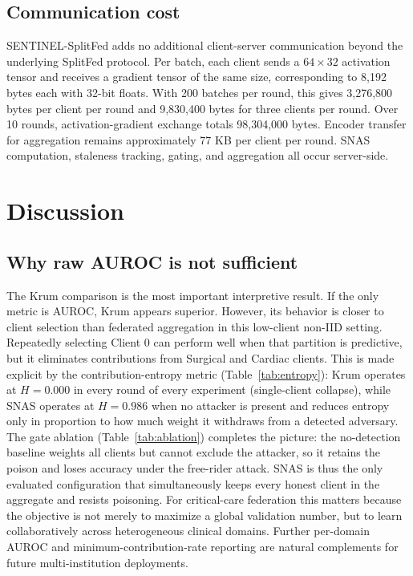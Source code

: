\documentclass[pdflatex,sn-mathphys-num]{sn-jnl}
\begin{document}
\subsection{Communication cost}

SENTINEL-SplitFed adds no additional client-server communication beyond the underlying SplitFed protocol. Per batch, each client sends a $64\times32$ activation tensor and receives a gradient tensor of the same size, corresponding to 8,192 bytes each with 32-bit floats. With 200 batches per round, this gives 3,276,800 bytes per client per round and 9,830,400 bytes for three clients per round. Over 10 rounds, activation-gradient exchange totals 98,304,000 bytes. Encoder transfer for aggregation remains approximately 77 KB per client per round. SNAS computation, staleness tracking, gating, and aggregation all occur server-side.

\section{Discussion}\label{sec:discussion}

\subsection{Why raw AUROC is not sufficient}

The Krum comparison is the most important interpretive result. If the only metric is AUROC, Krum appears superior. However, its behavior is closer to client selection than federated aggregation in this low-client non-IID setting. Repeatedly selecting Client 0 can perform well when that partition is predictive, but it eliminates contributions from Surgical and Cardiac clients. This is made explicit by the contribution-entropy metric (Table~\ref{tab:entropy}): Krum operates at $H=0.000$ in every round of every experiment (single-client collapse), while SNAS operates at $H=0.986$ when no attacker is present and reduces entropy only in proportion to how much weight it withdraws from a detected adversary. The gate ablation (Table~\ref{tab:ablation}) completes the picture: the no-detection baseline weights all clients but cannot exclude the attacker, so it retains the poison and loses accuracy under the free-rider attack. SNAS is thus the only evaluated configuration that simultaneously keeps every honest client in the aggregate and resists poisoning. For critical-care federation this matters because the objective is not merely to maximize a global validation number, but to learn collaboratively across heterogeneous clinical domains. Further per-domain AUROC and minimum-contribution-rate reporting are natural complements for future multi-institution deployments.
\end{document}
